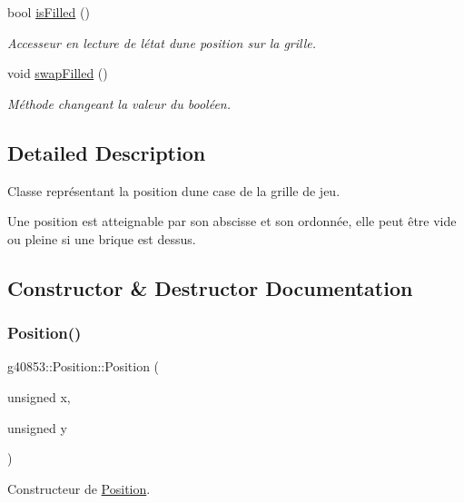 \begin{DoxyCompactItemize}
bool \hyperlink{classg40853_1_1_position_a7f72d7ae6ea209e2a65856b1065990fa}{is\+Filled} ()
\begin{DoxyCompactList}\small\item\em Accesseur en lecture de l\textquotesingle{}état d\textquotesingle{}une position sur la grille. \end{DoxyCompactList}\item 
\hypertarget{classg40853_1_1_position_ac5bca566d8c48eae5f184ab59677ded1}{}\label{classg40853_1_1_position_ac5bca566d8c48eae5f184ab59677ded1} 
void \hyperlink{classg40853_1_1_position_ac5bca566d8c48eae5f184ab59677ded1}{swap\+Filled} ()
\begin{DoxyCompactList}\small\item\em Méthode changeant la valeur du booléen. \end{DoxyCompactList}\end{DoxyCompactItemize}


\subsection{Detailed Description}
Classe représentant la position d\textquotesingle{}une case de la grille de jeu. 

Une position est atteignable par son abscisse et son ordonnée, elle peut être vide ou pleine si une brique est dessus. 

\subsection{Constructor \& Destructor Documentation}
\hypertarget{classg40853_1_1_position_a1e68bc9f15d9a52a4151537df34858b8}{}\label{classg40853_1_1_position_a1e68bc9f15d9a52a4151537df34858b8} 
\subsubsection{\texorpdfstring{Position()}{Position()}}
{\footnotesize\ttfamily g40853\+::\+Position\+::\+Position (\begin{DoxyParamCaption}\item[{unsigned}]{x,  }\item[{unsigned}]{y }\end{DoxyParamCaption})}



Constructeur de \hyperlink{classg40853_1_1_position}{Position}. 

